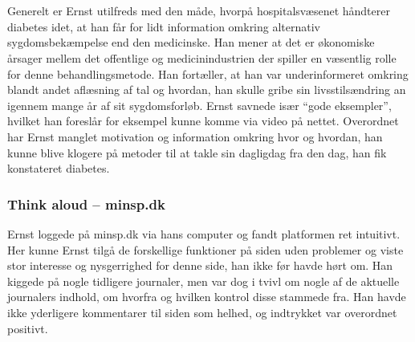 \\ \\
Generelt er Ernst utilfreds med den måde, hvorpå hospitalsvæsenet håndterer diabetes idet, at han får for lidt information omkring alternativ sygdomsbekæmpelse end den medicinske. Han mener at det er økonomiske årsager mellem det offentlige og medicinindustrien der spiller en væsentlig rolle for denne behandlingsmetode. Han fortæller, at han var underinformeret omkring blandt andet aflæsning af tal og hvordan, han skulle gribe sin livsstilsændring an igennem mange år af sit sygdomsforløb. Ernst savnede især “gode eksempler”, hvilket han foreslår for eksempel kunne komme via video på nettet. Overordnet har Ernst manglet motivation og information omkring hvor og hvordan, han kunne blive klogere på metoder til at takle sin dagligdag fra den dag, han fik konstateret diabetes.

\subsubsection*{Think aloud – minsp.dk} 
Ernst loggede på minsp.dk via hans computer og fandt platformen ret intuitivt. Her kunne Ernst tilgå de forskellige funktioner på siden uden problemer og viste stor interesse og nysgerrighed for denne side, han ikke før havde hørt om. Han kiggede på nogle tidligere journaler, men var dog i tvivl om nogle af de aktuelle journalers indhold, om hvorfra og hvilken kontrol disse stammede fra. Han havde ikke yderligere kommentarer til siden som helhed, og indtrykket var overordnet positivt.
